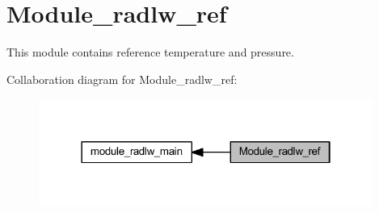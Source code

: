 \hypertarget{group__module__radlw__ref}{}\section{Module\+\_\+radlw\+\_\+ref}
\label{group__module__radlw__ref}


This module contains reference temperature and pressure.  


Collaboration diagram for Module\+\_\+radlw\+\_\+ref\+:\nopagebreak
\begin{figure}[H]
\begin{center}
\leavevmode
\includegraphics[width=310pt]{group__module__radlw__ref}
\end{center}
\end{figure}
